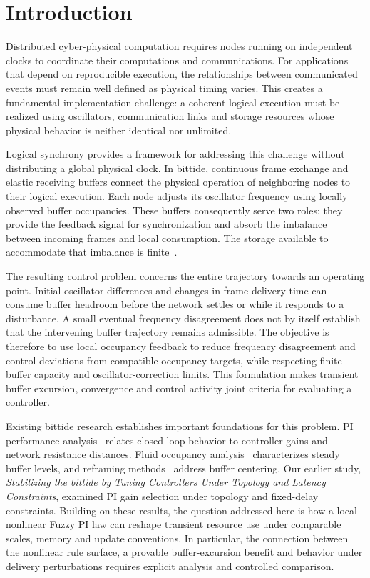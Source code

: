 \section{Introduction}
\label{sec:introduction}

Distributed cyber-physical computation requires nodes running on independent clocks to coordinate their computations and communications. For applications that depend on reproducible execution, the relationships between communicated events must remain well defined as physical timing varies. This creates a fundamental implementation challenge: a coherent logical execution must be realized using oscillators, communication links and storage resources whose physical behavior is neither identical nor unlimited.

Logical synchrony provides a framework for addressing this challenge without distributing a global physical clock. In bittide, continuous frame exchange and elastic receiving buffers connect the physical operation of neighboring nodes to their logical execution. Each node adjusts its oscillator frequency using locally observed buffer occupancies. These buffers consequently serve two roles: they provide the feedback signal for synchronization and absorb the imbalance between incoming frames and local consumption. The storage available to accommodate that imbalance is finite~\cite{lall2024logicalSynchrony}.

The resulting control problem concerns the entire trajectory towards an operating point. Initial oscillator differences and changes in frame-delivery time can consume buffer headroom before the network settles or while it responds to a disturbance. A small eventual frequency disagreement does not by itself establish that the intervening buffer trajectory remains admissible. The objective is therefore to use local occupancy feedback to reduce frequency disagreement and control deviations from compatible occupancy targets, while respecting finite buffer capacity and oscillator-correction limits. This formulation makes transient buffer excursion, convergence and control activity joint criteria for evaluating a controller.

Existing bittide research establishes important foundations for this problem. PI performance analysis~\cite{lall2022resistance} relates closed-loop behavior to controller gains and network resistance distances. Fluid occupancy analysis~\cite{lall2024bufferOccupancy} characterizes steady buffer levels, and reframing methods~\cite{lall2023bufferCentering} address buffer centering. Our earlier study, \emph{Stabilizing the bittide by Tuning Controllers Under Topology and Latency Constraints}, examined PI gain selection under topology and fixed-delay constraints. Building on these results, the question addressed here is how a local nonlinear Fuzzy PI law can reshape transient resource use under comparable scales, memory and update conventions. In particular, the connection between the nonlinear rule surface, a provable buffer-excursion benefit and behavior under delivery perturbations requires explicit analysis and controlled comparison.

